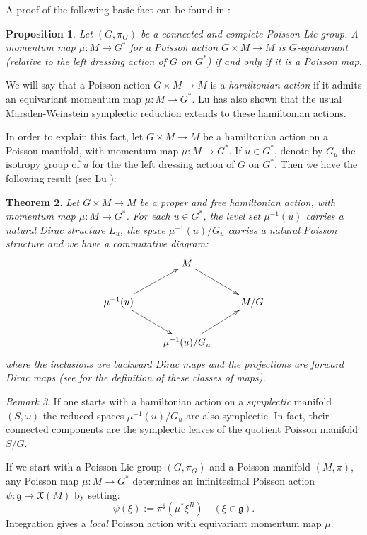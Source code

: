 \documentclass[a4paper,11pt]{amsart}
\newtheorem{thm}{Theorem}[section]
\newtheorem{prop}[thm]{Proposition}
\theoremstyle{definition}
\theoremstyle{remark}
\newtheorem{rem}[thm]{Remark}
\begin{document}
A proof of the following basic fact can be found in \cite{Lu1}:

\begin{prop}
Let $(G,\pi_G)$ be a connected and complete Poisson-Lie group. A
momentum map $\mu:M\to G^*$ for a Poisson action $G\times
M\to M$ is $G$-equivariant (relative to the left dressing action
of $G$ on $G^*$) if and only if it is a Poisson map.
\end{prop}

We will say that a Poisson action $G\times M\to M$ is a \emph{hamiltonian action} if it admits an equivariant
momentum map $\mu:M\to G^*$. Lu has also shown that the usual Marsden-Weinstein symplectic reduction extends to
these hamiltonian actions.

In order to explain this fact, let $G\times M\to M$ be a hamiltonian action on a Poisson manifold, with momentum
map $\mu:M\to G^*$. If $u\in G^*$, denote by $G_u$ the isotropy group of $u$ for the the left dressing action of
$G$ on $G^*$. Then we have the following result (see Lu \cite{Lu1}):

\begin{thm}
Let $G\times M\to M$ be a proper and free hamiltonian action, with momentum map $\mu:M\to G^*$.
For each $u\in G^*$, the level set $\mu^{-1}(u)$ carries a
natural Dirac structure $L_u$, the space
$\mu^{-1}(u)/G_u$ carries a natural Poisson structure and
we have a commutative diagram:
\[
\xymatrix{
     &M\ar[dr]\\
\mu^{-1}(u)\ar[ur]\ar[dr]& &M/G\\
 &\mu^{-1}(u)/G_u\ar[ur]}
\]
where the inclusions are backward Dirac maps and the projections are forward Dirac maps (see \cite{BuRa} for the
definition of these classes of maps).
\end{thm}

\begin{rem}
If one starts with a hamiltonian action on a \emph{symplectic} manifold $(S,\omega)$ the reduced spaces
$\mu^{-1}(u)/G_u$ are also symplectic. In fact, their connected components are the symplectic leaves of the
quotient Poisson manifold $S/G$.
\end{rem}

If we start with a Poisson-Lie group $(G,\pi_G)$ and a Poisson manifold $(M,\pi)$, any Poisson map $\mu:M\to
G^*$ determines an infinitesimal Poisson action $\psi:{\mathfrak{g}}\to{\ensuremath{\mathfrak{X}}}(M)$ by setting:
\[ \psi(\xi):=\pi^{\sharp}(\mu^*\xi^R)\quad (\xi\in{\mathfrak{g}}). \]
Integration gives a \emph{local} Poisson action with equivariant
momentum map $\mu$.
\end{document}
